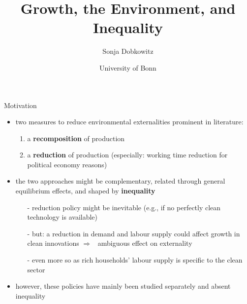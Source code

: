 \documentclass[11pt,aspectratio=169]{beamer}
\author[Sonja Dobkowitz]{\small Sonja Dobkowitz}
\title{Growth, the Environment, and Inequality}
\date{\footnotesize{University of Bonn}}
\institute{December 14, 2021}
\newcommand{\ar}{$\Rightarrow$ \ }
\begin{document}
	
	{
		\begin{frame}
		\titlepage
	\end{frame}
}




\begin{frame}{Motivation}

\begin{itemize}
\item two measures to reduce environmental externalities prominent in literature: 
\begin{enumerate}
\item a \alert{\textbf{recomposition}} of production
\item a \textbf{\alert{reduction}} of production (especially: working time reduction for political economy reasons)
\end{enumerate}
\vspace{3mm} 
\item the two approaches might be complementary, related through general equilibrium effects, and shaped by \textbf{\alert{inequality}}
\vspace{3mm}
\begin{itemize}
\item[-] reduction policy might be inevitable (e.g., if no perfectly clean technology is available)
\item[-] but: a reduction in demand and labour supply could affect growth in clean innovations \ar ambiguous effect on externality
\item[-] even more so as rich households' labour supply is specific to the clean sector
\end{itemize}
\vspace{3mm}
\item however,  these policies have mainly been studied separately and absent inequality
\end{itemize}
\end{frame}
\end{document}
